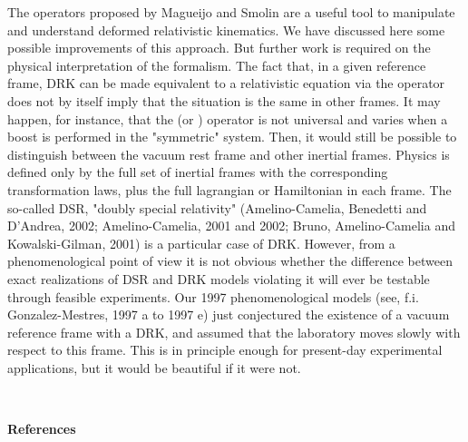 \documentclass[a4paper,12pt,dvips]{article}
\begin{document}
The \coordHE{} operators proposed by Magueijo and Smolin are a useful tool to manipulate and understand deformed relativistic kinematics. We have discussed here some possible improvements of this approach. But further work is required on the physical interpretation of the formalism. The fact that, in a given reference frame, DRK can be made equivalent to a relativistic equation via the \coordHE{} operator does not by itself imply that the situation is the same in other frames. It may happen, for instance, that the \coordHE{} (or \coordHE{}) operator is not universal and varies when a boost is performed in the "symmetric" system. Then, it would still be possible to distinguish between the vacuum rest frame and other inertial frames. Physics is defined only by the full set of inertial frames with the corresponding transformation laws, plus the full lagrangian or Hamiltonian in each frame. The so-called DSR, "doubly special relativity" (Amelino-Camelia, Benedetti and D'Andrea, 2002; Amelino-Camelia, 2001 and 2002; Bruno, Amelino-Camelia and Kowalski-Gilman, 2001) is a particular case of DRK. However, from a phenomenological point of view it is not obvious whether the difference between exact realizations of DSR and DRK models violating it will ever be testable through feasible experiments. Our 1997 phenomenological models (see, f.i. Gonzalez-Mestres, 1997 a to 1997 e) just conjectured the existence of a vacuum reference frame with a DRK, and assumed that the laboratory moves slowly with respect to this frame. This is in principle enough for present-day experimental applications, but it would be beautiful if it were not.

~ 

%
%
%
\vspace{1ex}
\begin{center}
{\bf References}
\end{center}
\end{document}
